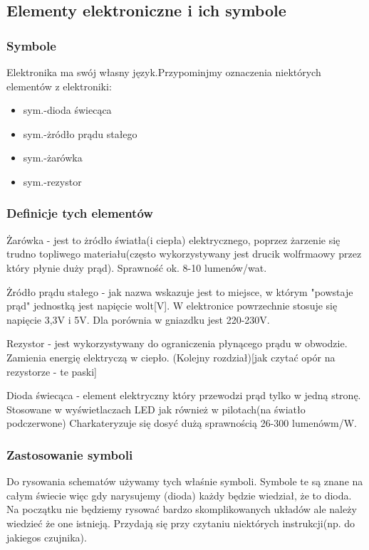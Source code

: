 	\subsection{Elementy elektroniczne i ich symbole}
	\subsubsection {Symbole}
	Elektronika ma swój własny język.Przypominjmy oznaczenia niektórych elementów z elektroniki:
\begin{itemize}
	\item sym.-dioda świecąca
	\item sym.-żródło prądu stałego
	\item sym.-żarówka
	\item sym.-rezystor
\end{itemize}
   \subsubsection{Definicje tych elementów}
	
Żarówka - jest to żródło światła(i ciepła) elektrycznego, poprzez żarzenie się trudno topliwego materiału(często wykorzystywany jest drucik wolfrmaowy przez który płynie duży prąd). Sprawność ok.
8-10 lumenów/wat. 

Żródło prądu stałego - jak nazwa wskazuje jest to miejsce, w którym "powstaje prąd" jednostką jest napięcie wolt[V]. W elektronice powrzechnie stosuje się napięcie 3,3V i 5V. Dla porównia w gniazdku jest 220-230V.

Rezystor - jest wykorzystywany do ograniczenia płynącego prądu w obwodzie. Zamienia energię elektryczą w ciepło. (Kolejny rozdział)[jak czytać opór na rezystorze - te paski]

Dioda świecąca - element elektryczny który przewodzi prąd tylko w jedną stronę. Stosowane w wyświetlaczach LED jak również w pilotach(na światło podczerwone) Charkateryzuje się dosyć dużą sprawnością 26-300 lumenówm/W. 

\subsubsection{Zastosowanie symboli}
    
Do rysowania schematów używamy tych właśnie symboli. Symbole te są znane na całym świecie więc gdy narysujemy (dioda) każdy będzie wiedział, że to dioda. Na początku nie będziemy rysować bardzo skomplikowanych układów ale należy wiedzieć że one istnieją. Przydają się przy czytaniu niektórych instrukcji(np. do jakiegos czujnika).

